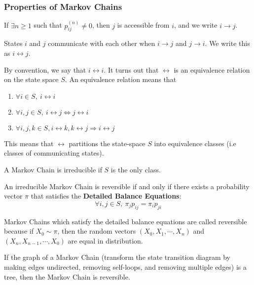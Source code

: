 \subsubsection{Properties of Markov Chains}
\begin{definition}
	If $\exists n \geq 1$ such that $p_{ij}^{(n)} \ne 0$, then $j$ is accessible from $i$, and we write $i\rightarrow j$.
	\label{defn:accesible}
\end{definition}
\begin{definition}
	States $i$ and $j$ communicate with each other when $i\rightarrow j$ and $j\rightarrow i$. We write this as $i\leftrightarrow j$.
	\label{defn:communicate}
\end{definition}
By convention, we say that $i\leftrightarrow i$.
It turns out that $\leftrightarrow$ is an equivalence relation on the state space $S$.
An equivalence relation means that 
\begin{enumerate}
	\item $\forall i\in S,\ i \leftrightarrow i$
	\item $\forall i,j\in S,\ i\leftrightarrow j \Leftrightarrow j \leftrightarrow i$
	\item $\forall i,j,k \in S, i\leftrightarrow k, k\leftrightarrow j \Rightarrow i \leftrightarrow j$
\end{enumerate}
This means that $\leftrightarrow$ partitions the state-space $S$ into equivalence classes (i.e classes of communicating states).
\begin{definition}
	A Markov Chain is irreducible if $S$ is the only class.
	\label{defn:irreducible-markov}
\end{definition}
\begin{definition}
	An irreducible Markov Chain is reversible if and only if there exists a probability vector $\pi$ that satisfies the \textbf{Detailed Balance Equations}: \[
		\forall i,j \in S,\ \pi_j p_{ij} = \pi_i p_{ji}
	\]
	\label{defn:reversible-markov}
\end{definition}
Markov Chains which satisfy the detailed balance equations are called reversible because if $X_0\sim \pi$, then the random vectors $(X_0, X_1, \cdots, X_n)$ and $(X_n, X_{n-1}, \cdots, X_0)$ are equal in distribution.
\begin{theorem}
	If the graph of a Markov Chain (transform the state transition diagram by making edges undirected, removing self-loops, and removing multiple edges) is a tree, then the Markov Chain is reversible.
	\label{thm:tree-markov}
\end{theorem}
